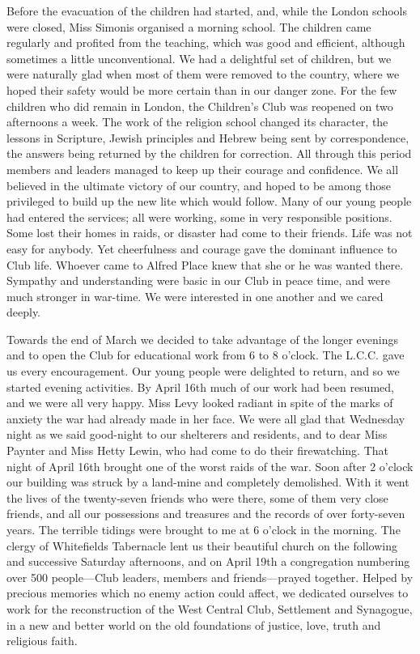 Before the evacuation of the children had started, and,
while the London schools were closed, Miss Simonis
organised a morning school. The children came regularly
and profited from the teaching, which was good and
efficient, although sometimes a little unconventional. We
had a delightful set of children, but we were naturally
glad when most of them were removed to the country,
where we hoped their safety would be more certain than
in our danger zone. For the few children who did remain
in London, the Children’s Club was reopened on two
afternoons a week. The work of the religion school
changed its character, the lessons in Scripture, Jewish
principles and Hebrew being sent by correspondence, the
answers being returned by the children for correction.
All through this period members and leaders
managed to keep up their courage and confidence. We
all believed in the ultimate victory of our country, and
hoped to be among those privileged to build up the new
lite which would follow. Many of our young people had
entered the services; all were working, some in very
responsible positions. Some lost their homes in raids, or
disaster had come to their friends. Life was not easy for
anybody. Yet cheerfulness and courage gave the dominant
influence to Club life. Whoever came to Alfred Place
knew that she or he was wanted there. Sympathy and
understanding were basic in our Club in peace time, and
were much stronger in war-time. We were interested in
one another and we cared deeply.

Towards the end of March we decided to take advantage
of the longer evenings and to open the Club for
educational work from 6 to 8 o’clock. The L.C.C. gave
us every encouragement. Our young people were delighted
to return, and so we started evening activities.
By April 16th much of our work had been resumed, and
we were all very happy. Miss Levy looked radiant in
spite of the marks of anxiety the war had already made
in her face. We were all glad that Wednesday night as
we said good-night to our shelterers and residents, and
to dear Miss Paynter and Miss Hetty Lewin, who had
come to do their firewatching. That night of
April 16th brought one of the worst raids of the war.
Soon after 2 o’clock our building was struck by a land-mine
and completely demolished. With it went the lives
of the twenty-seven friends who were there, some of them
very close friends, and all our possessions and treasures
and the records of over forty-seven years. The terrible
tidings were brought to me at 6 o'clock in the morning.
The clergy of Whitefields Tabernacle lent us their
beautiful church on the following and successive Saturday
afternoons, and on April 19th a congregation numbering
over 500 people—Club leaders, members and
friends—prayed together. Helped by precious memories
which no enemy action could affect, we dedicated ourselves
to work for the reconstruction of the West Central
Club, Settlement and Synagogue, in a new and better
world on the old foundations of justice, love, truth and
religious faith.
